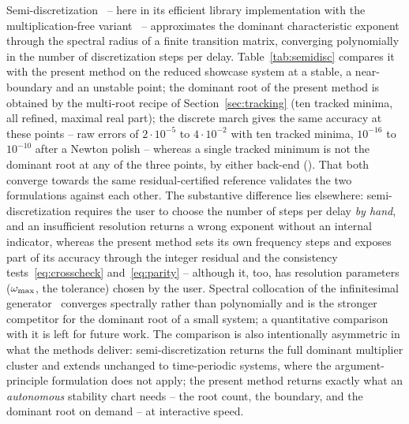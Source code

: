 Semi-discretization~\cite{insperger2011semidiscretization} -- here in its
efficient library implementation with the multiplication-free
variant~\cite{bachrathy2026semidisc,bachrathy2026multiplication} --
approximates the dominant characteristic exponent through the spectral
radius of a finite transition matrix, converging polynomially in the number
of discretization steps per delay. Table~\ref{tab:semidisc} compares it with
the present method on the reduced showcase system at a stable, a
near-boundary and an unstable point; the dominant root of the present method
is obtained by the multi-root recipe of Section~\ref{sec:tracking} (ten
tracked minima, all refined, maximal real part); the discrete march gives the
same accuracy at these points -- raw errors of $2\cdot10^{-5}$ to
$4\cdot10^{-2}$ with ten tracked minima, $10^{-16}$ to $10^{-10}$ after a
Newton polish -- whereas a single tracked minimum is not the dominant root
at any of the three points, by either back-end ().
That both converge towards
the same residual-certified reference validates the two formulations against
each other. The substantive difference lies elsewhere: semi-discretization
requires the user to choose the number of steps per delay \emph{by hand},
and an insufficient resolution returns a wrong exponent without an internal
indicator, whereas the present method sets its own frequency steps and
exposes part of its accuracy through the integer residual and the
consistency tests~\eqref{eq:crosscheck} and~\eqref{eq:parity} -- although it,
too, has resolution parameters ($\omega_{\mathrm{max}}$, the tolerance) chosen by the user.
Spectral collocation of the infinitesimal
generator~\cite{breda2005pseudospectral,breda2009tracedde} converges
spectrally rather than polynomially and is the stronger competitor for the
dominant root of a small system; a quantitative comparison with it is left
for future work. The comparison is also intentionally
asymmetric in what the methods deliver: semi-discretization returns the full
dominant multiplier cluster and extends unchanged to time-periodic systems,
where the argument-principle formulation does not apply; the present method
returns exactly what an \emph{autonomous} stability chart needs -- the root
count, the boundary, and the dominant root on demand -- at interactive
speed.


